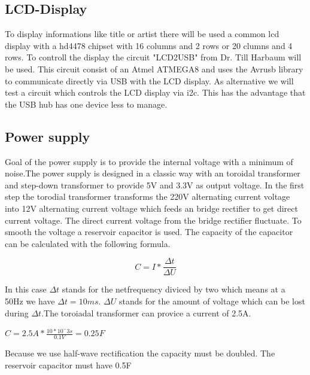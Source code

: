 \subsection{LCD-Display}
To display informations like title or artist there will be used a common lcd display with a hd4478 chipset with 16 columns and 2 rows or 20 clumns and 4 rows. To controll the display the circuit "LCD2USB" from Dr. Till Harbaum will be used. This circuit consist of an Atmel ATMEGA8 and uses the Avrusb library to communicate directly via USB with the LCD display. As alternative we will test a circuit which controls the LCD display via i2c. This has the advantage that the USB hub has one device less to manage.
\subsection{Power supply}
Goal of the power supply is to provide the internal voltage with a minimum of noise.The power supply is designed in a classic way with an toroidal transformer and step-down transformer to provide 5V and 3.3V as output voltage. In the first step the torodial transformer transforms the 220V alternating current voltage into 12V alternating current voltage which feeds an bridge rectifier to get direct current voltage. The direct current voltage from the bridge rectifier fluctuate. To smooth the voltage a reservoir capacitor is used. The capacity of the capacitor can be calculated with the following formula.


\begin{equation}
	C=I*\frac{\Delta t}{\Delta U}
	\label{reservoidCapacitor}
\end{equation} 

In this case $\Delta t$ stands for the netfrequency diviced by two which means at a 50Hz we have $\Delta t = 10ms$. $\Delta U$ stands for the amount of voltage which can be lost during $\Delta t$.The toroiadal transformer can provice a current of 2.5A. 
\begin{center}
	$C=2.5A * \frac{10*10^-3s}{0.1V}=0.25F$
\end{center}
Because we use half-wave rectification the capacity must be doubled. The reservoir capacitor must have 0.5F


